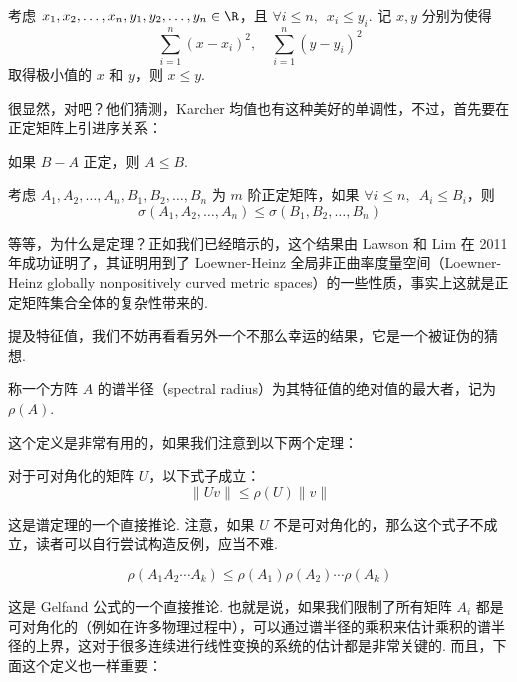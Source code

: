 \begin{lemma}
    考虑 $x_1, x_2, \ldots, x_n, y_1, y_2, \ldots, y_n \in \R$，且 $\forall i \leqslant n,\enspace x_i \leqslant y_i$. 记 $x, y$ 分别为使得
    \[ \sum_{i = 1}^n (x - x_i)^2, \quad \sum_{i = 1}^n (y - y_i)^2 \]
    取得极小值的 $x$ 和 $y$，则 $x \leqslant y$.
\end{lemma}

很显然，对吧？他们猜测，Karcher 均值也有这种美好的单调性，不过，首先要在正定矩阵上引进序关系：

\begin{definition}
    如果 $B - A$ 正定，则 $A \leqslant B$.
\end{definition}

\begin{theorem}
    考虑 $A_1, A_2, \ldots, A_n, B_1, B_2, \ldots, B_n$ 为 $m$ 阶正定矩阵，如果 $\forall i \leqslant n,\enspace A_i \leqslant B_i$，则
    \[ \sigma(A_1, A_2, \ldots, A_n) \leqslant \sigma(B_1, B_2, \ldots, B_n) \]
\end{theorem}

等等，为什么是定理？正如我们已经暗示的，这个结果由 Lawson 和 Lim 在 2011 年成功证明了，其证明用到了 Loewner-Heinz 全局非正曲率度量空间（Loewner-Heinz globally nonpositively curved metric spaces）的一些性质，事实上这就是正定矩阵集合全体的复杂性带来的.

提及特征值，我们不妨再看看另外一个不那么幸运的结果，它是一个被证伪的猜想.

\begin{definition}
    称一个方阵 $A$ 的谱半径（spectral radius）为其特征值的绝对值的最大者，记为 $\rho(A)$.
\end{definition}

这个定义是非常有用的，如果我们注意到以下两个定理：

\begin{theorem}
    对于可对角化的矩阵 $U$，以下式子成立：
    \[ \lVert Uv \rVert \leqslant \rho(U) \lVert v \rVert \]
\end{theorem}

这是谱定理的一个直接推论. 注意，如果 $U$ 不是可对角化的，那么这个式子不成立，读者可以自行尝试构造反例，应当不难.

\begin{theorem}
    \[ \rho(A_1A_2\cdots A_k) \leqslant \rho(A_1)\rho(A_2)\cdots \rho(A_k) \]
\end{theorem}

这是 Gelfand 公式的一个直接推论. 也就是说，如果我们限制了所有矩阵 $A_i$ 都是可对角化的（例如在许多物理过程中），可以通过谱半径的乘积来估计乘积的谱半径的上界，这对于很多连续进行线性变换的系统的估计都是非常关键的. 而且，下面这个定义也一样重要：

